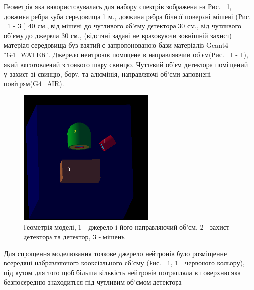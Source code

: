 \documentclass[a4paper, 14pt]{article}
\numberwithin{equation}{section}
\numberwithin{table}{section}
\begin{document}
Геометрія яка використовувалась для набору спектрів зображена на Рис. ~\ref{ris:Geometry}, довжина ребра куба середовища 1 м., довжина ребра бічної поверхні мішені (Рис. ~\ref{ris:Geometry} - 3 ) 40 см., від мішені до чутливого об'єму детектора 30 см., від чутливого об'єму до джерела 30 см., (відстані задані не враховуючи зовнішній захист) матеріал середовища був взятий с запропонованою бази матеріалів Geant4 - "G4\_WATER". Джерело нейтронів поміщене в направляючий об'єм(Рис. ~\ref{ris:Geometry} - 1), який виготовлений з тонкого шару свинцю. Чуттєвий об'єм детектора поміщений у захист зі свинцю, бору, та алюмінія, направляючі об'єми заповнені повітрям(G4\_AIR).
\begin{figure}[!hbt]
	\centering \includegraphics[width=0.6\textwidth]{images/geometryAll.png}
	\caption{Геометрія моделі, 1 - джерело і його направляючий об'єм, 2 - захист детектора та детектор, 3 - мішень} 
	\label{ris:Geometry}	
\end{figure}
Для спрощення моделювання точкове джерело нейтронів було розміщенне всередині набравляючого кооксіального об'єму (Рис. ~\ref{ris:Geometry}, 1 - червоного кольору), під кутом для того щоб більша кількість нейтронів потрапляла в поверхню яка безпосередню знаходиться під чутливим об'ємом детектора 
\end{document}
